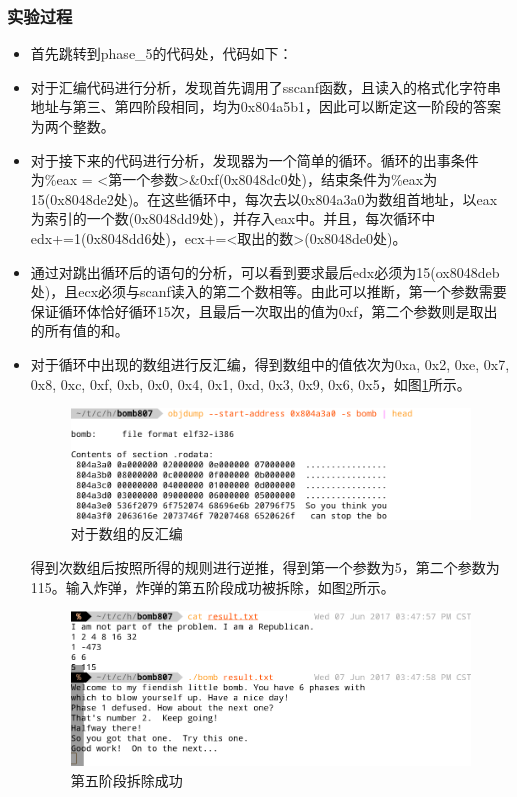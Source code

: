 \subsubsection{实验过程}
\begin{itemize}
	\item 首先跳转到phase\_5的代码处，代码如下：
		\begin{codeFont}
			
		\end{codeFont}
	\item 对于汇编代码进行分析，发现首先调用了sscanf函数，且读入的格式化字符串地址与第三、第四阶段相同，均为0x804a5b1，因此可以断定这一阶段的答案为两个整数。
	\item 对于接下来的代码进行分析，发现器为一个简单的循环。循环的出事条件为\%eax = <第一个参数>\&0xf(0x8048dc0处)，结束条件为\%eax为15(0x8048de2处)。在这些循环中，每次去以0x804a3a0为数组首地址，以eax为索引的一个数(0x8048dd9处)，并存入eax中。并且，每次循环中edx+=1(0x8048dd6处)，ecx+=<取出的数>(0x8048de0处)。
	\item 通过对跳出循环后的语句的分析，可以看到要求最后edx必须为15(ox8048deb处)，且ecx必须与scanf读入的第二个数相等。由此可以推断，第一个参数需要保证循环体恰好循环15次，且最后一次取出的值为0xf，第二个参数则是取出的所有值的和。
	\item 对于循环中出现的数组进行反汇编，得到数组中的值依次为0xa, 0x2, 0xe, 0x7, 0x8, 0xc, 0xf, 0xb, 0x0, 0x4, 0x1, 0xd, 0x3, 0x9, 0x6, 0x5，如图\ref{fig:fig10}所示。
	\begin{figure}[H]
		\centering
		\includegraphics[width=0.95\linewidth]{resources/fig10.png}
		\caption{对于数组的反汇编}
		\label{fig:fig10}
	\end{figure}
	得到次数组后按照所得的规则进行逆推，得到第一个参数为5，第二个参数为115。输入炸弹，炸弹的第五阶段成功被拆除，如图\ref{fig:fig11}所示。
	\begin{figure}[H]
		\centering
		\includegraphics[width=0.95\linewidth]{resources/fig11.png}
		\caption{第五阶段拆除成功}
		\label{fig:fig11}
	\end{figure}
\end{itemize}

